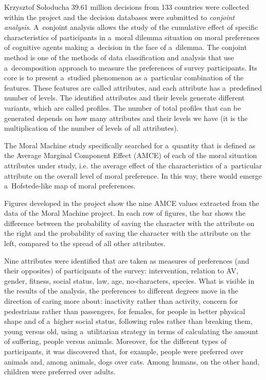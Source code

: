 \begin{artengenv}{Krzysztof Sołoducha}
39.61 million decisions from 133 countries were collected within the project and the decision databases were submitted to \textit{conjoint analysis}. A~conjoint analysis allows the study of the cumulative effect of specific characteristics of participants in a~moral dilemma situation on moral preferences of cognitive agents making a~decision in the face of a~dilemma. The conjoint method is one of the methods of data classification and analysis that use a~decomposition approach to measure the preferences of survey participants. Its core is to present a~studied phenomenon as a~particular combination of the features. These features are called attributes, and each attribute has a~predefined number of levels. The identified attributes and their levels generate different variants, which are called profiles. The number of total profiles that can be generated depends on how many attributes and their levels we have (it is the multiplication of the number of levels of all attributes).

The Moral Machine study specifically searched for a~quantity that is defined as the Average Marginal Component Effect (AMCE) of each of the moral situation attributes under study, i.e. the average effect of the characteristics of a~particular attribute on the overall level of moral preference. In this way, there would emerge a~Hofstede-like map of moral preferences.

Figures developed in the project show the nine AMCE values extracted from the data of the Moral Machine project. In each row of figures, the bar shows the difference between the probability of saving the character with the attribute on the right and the probability of saving the character with the attribute on the left, compared to the spread of all other attributes.

Nine attributes were identified that are taken as measures of preferences (and their opposites) of participants of the survey: intervention, relation to AV, gender, fitness, social status, law, age, no-characters, species. What is visible in the results of the analysis, the preferences to different degrees move in the direction of caring more about: inactivity rather than activity, concern for pedestrians rather than passengers, for females, for people in better physical shape and of a~higher social status, following rules rather than breaking them, young versus old, using a~utilitarian strategy in terms of calculating the amount of suffering, people versus animals. Moreover, for the different types of participants, it was discovered that, for example, people were preferred over animals and, among animals, dogs over cats. Among humans, on the other hand, children were preferred over adults.


\end{artengenv}
